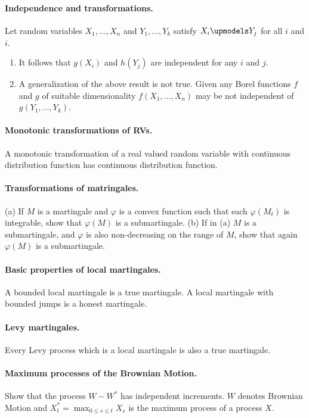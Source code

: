 

\paragraph{Independence and transformations. } Let random variables $X_1,\ldots,X_n$ and
$Y_1,\ldots,Y_k$ satisfy $X_i \upmodels Y_j$ for all $i$ and $i$.
\begin{enumerate}
    \item It follows that $g(X_i)$ and $h(Y_j)$ are independent for any $i$ and $j$.
    \item A generalization of the above result is not true. Given
any Borel functions $f$ and $g$ of suitable dimensionality 
$f(X_1,\ldots,X_n)$ may be not independent of $g(Y_1,\ldots,Y_k)$.
\end{enumerate}


\paragraph{Monotonic transformations of RVs. }   A monotonic transformation of a real
valued random variable with continuous distribution function has continuous
distribution function. 


\paragraph{Transformations of matringales.} (a) If $M$ is a martingale and
$\varphi$ is a convex function such that each $\varphi(M_t)$ is integrable,
show that $\varphi(M)$ is a submartingale.  (b) If in (a) $M$ is a submartingale,
and $\varphi$ is also non-decreasing on the range of $M$, show that again $\varphi(M)$ is a
submartingale.


\paragraph{Basic properties of local martingales. } A bounded local martingale is a 
true martingale. A local martingale with bounded jumps is a honest martingale.


\paragraph{Levy martingales.  } Every Levy process which is a local martingale is also a true martingale.


\paragraph{Maximum processes of the Brownian Motion. } 
Show that the process $W - W^*$ has independent increments. $W$ denotes
Brownian Motion and $X^*_t= \max_{0 \leq s \leq t} X_s$ is the maximum process of 
a \cadlag process $X$.




